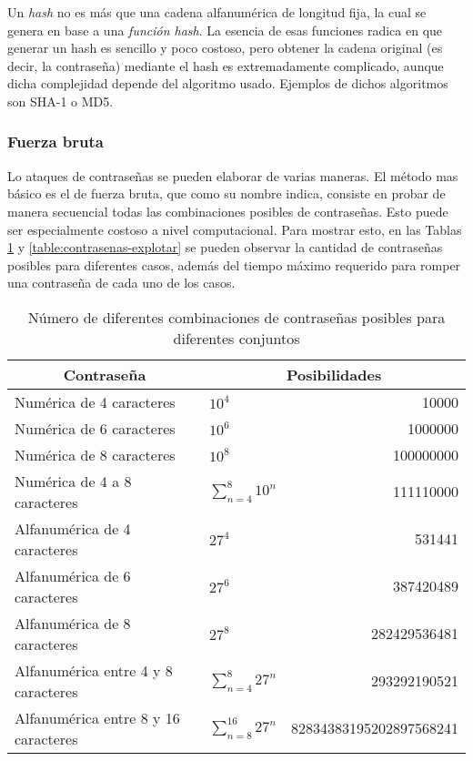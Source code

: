 Un \emph{hash} no es más que una cadena alfanumérica de longitud fija, la cual se genera en base a una \emph{función hash}. La esencia de esas funciones radica en que generar un hash es sencillo y poco costoso, pero obtener la cadena original (es decir, la contraseña) mediante el hash es extremadamente complicado, aunque dicha complejidad depende del algoritmo usado. Ejemplos de dichos algoritmos son SHA-1 o MD5.

\subsubsection{Fuerza bruta}

Lo ataques de contraseñas se pueden elaborar de varias maneras. El método mas básico es el de fuerza bruta, que como su nombre indica, consiste en probar de manera secuencial todas las combinaciones posibles de contraseñas. Esto puede ser especialmente costoso a nivel computacional. Para mostrar esto, en las Tablas \ref{table:contrasenas} y \ref{table:contrasenas-explotar} se pueden observar la cantidad de contraseñas posibles para diferentes casos, además del tiempo máximo requerido para romper una contraseña de cada uno de los casos.

\begin{table}[H]
	\centering
	\begin{tabular}{ |l|l|r| } 
		\hline
		\multicolumn{1}{|c|}{Contraseña} & 
		\multicolumn{2}{|c|}{Posibilidades} \\
		\hline
		Numérica de 4 caracteres 				& $ 10^4 $						& 10000 					\\
		Numérica de 6 caracteres 				& $ 10^6 $ 						& 1000000				 	\\
		Numérica de 8 caracteres 				& $ 10^8 $ 						& 100000000 			 	\\
		Numérica de 4 a 8 caracteres 			& $ \sum_{n=4}^{8} 10^{n} $ 	& 111110000 				\\
		\hline
		Alfanumérica de 4 caracteres 			& $ 27^4  $ 					& 531441  				 	\\
		Alfanumérica de 6 caracteres 			& $ 27^6 $ 						& 387420489  				\\
		Alfanumérica de 8 caracteres			& $ 27^8 $ 						& 282429536481 			 	\\
		Alfanumérica entre 4 y 8 caracteres		& $ \sum_{n=4}^{8} 27^{n} $		& 293292190521 				\\
		Alfanumérica entre 8 y 16 caracteres 	& $ \sum_{n=8}^{16} 27^{n} $	& 82834383195202897568241	\\
		\hline
	\end{tabular}
	\caption{Número de diferentes combinaciones de contraseñas posibles para diferentes conjuntos}
	\label{table:contrasenas}
\end{table}

